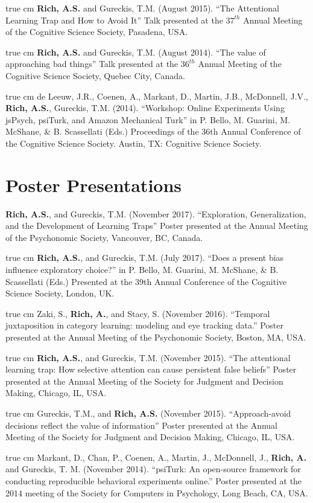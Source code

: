 \documentclass[12pt]{my_cv}
\def\ind{\hangindent=1 true cm\hangafter=1 \noindent}
\begin{document}
\ind \textbf{Rich, A.S.} and Gureckis, T.M. (August 2015). ``The Attentional
Learning Trap and How to Avoid It'' Talk presented at the $37^{th}$ Annual Meeting of the
Cognitive Science Society, Pasadena, USA.

\ind \textbf{Rich, A.S.} and Gureckis, T.M. (August 2014). ``The value of
approaching bad things'' Talk presented at the $36^{th}$ Annual Meeting of the
Cognitive Science Society, Quebec City, Canada.

\ind de Leeuw, J.R., Coenen, A., Markant, D., Martin, J.B., McDonnell, J.V.,
\textbf{Rich, A.S.}, Gureckis, T.M. (2014). ``Workshop: Online Experiments Using
jsPsych, psiTurk, and Amazon Mechanical Turk'' in P. Bello, M. Guarini, M.
McShane, \& B. Scassellati (Eds.) Proceedings of the 36th Annual Conference of
the Cognitive Science Society. Austin, TX: Cognitive Science Society.

\section{Poster Presentations}

\textbf{Rich, A.S.}, and Gureckis, T.M. (November 2017).
``Exploration, Generalization, and the Development of Learning Traps''
Poster presented at the Annual Meeting of the Psychonomic Society, Vancouver, BC, Canada.

\ind \textbf{Rich, A.S.}, and Gureckis, T.M. (July 2017). ``Does a present bias
influence exploratory choice?'' in P. Bello, M. Guarini, M.
McShane, \& B. Scassellati (Eds.) Presented at the 39th Annual Conference of
the Cognitive Science Society, London, UK.

\ind Zaki, S., \textbf{Rich, A.}, and Stacy, S. (November 2016).
``Temporal juxtaposition in category learning: modeling and eye tracking data.''
Poster presented at the Annual Meeting of the Psychonomic Society, Boston, MA, USA.

\ind \textbf{Rich, A.S.}, and Gureckis, T.M. (November 2015). ``The attentional
learning trap: How selective attention can cause persistent false beliefs''
Poster presented at the Annual Meeting of the Society for Judgment and Decision
Making, Chicago, IL, USA.

\ind Gureckis, T.M., and \textbf{Rich, A.S.} (November 2015). ``Approach-avoid
decisions reflect the value of information'' Poster presented at the Annual
Meeting of the Society for Judgment and Decision Making, Chicago, IL, USA.

\ind Markant, D., Chan, P., Coenen, A., Martin, J., McDonnell, J., \textbf{Rich,
  A.} and Gureckis, T. M. (November 2014). ``psiTurk: An open-source framework
for conducting reproducible behavioral experiments online.'' Poster presented at
the 2014 meeting of the Society for Computers in Psychology, Long Beach, CA,
USA.
\end{document}
